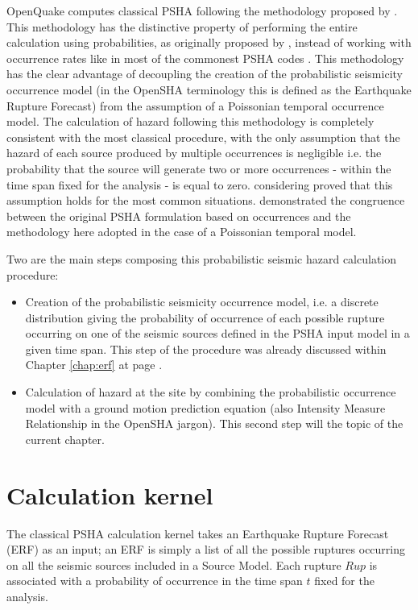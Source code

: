 OpenQuake computes classical PSHA 
\citep{cornell1968,mcguire2004} following the methodology proposed by 
\citet{field2003}. This methodology has the distinctive property of performing
the entire calculation using probabilities, as originally proposed by 
\citet{chiang1984}, instead of working with occurrence rates like in most 
of the commonest PSHA codes \citep[see for instance][]{bender1987}. 
%
This methodology has the clear advantage of decoupling the creation of the 
probabilistic seismicity occurrence model (in the OpenSHA terminology this is 
defined as the Earthquake Rupture Forecast) from the assumption of a Poissonian 
temporal occurrence model. 
%
The calculation of hazard following this methodology is completely consistent 
with the most classical procedure, with the only assumption that the hazard 
of each source produced by multiple occurrences is negligible i.e. the 
probability that the source will generate two or more occurrences - within the 
time span fixed for the analysis - is equal to zero. 
% 
\citet{pagani2007} considering proved that this assumption holds for the 
most common situations.
%
\citet{field2003} demonstrated the congruence between the original PSHA 
formulation based on occurrences and the methodology here adopted 
in the case of a Poissonian temporal model. 

Two are the main steps composing this probabilistic seismic hazard calculation 
procedure:
\begin{itemize}
\item Creation of the probabilistic seismicity occurrence model, i.e. a discrete 
distribution giving the probability of occurrence of each possible rupture 
occurring on one of the seismic sources defined in the PSHA input model in a  
given time span. This step of the procedure was already discussed within 
Chapter \ref{chap:erf} at page \pageref{chap:erf}.
\item Calculation of hazard at the site by combining the probabilistic 
occurrence model with a ground motion prediction equation (also Intensity 
Measure Relationship in the OpenSHA jargon). This second step will the topic 
of the current chapter.
\end{itemize}
%
\section{Calculation kernel}
The classical PSHA calculation kernel takes an Earthquake Rupture Forecast (ERF) 
as an input; an ERF is simply a list of all the possible ruptures occurring on 
all the seismic sources included in a Source Model. 
%
Each rupture $Rup$ is associated with a probability of occurrence in the time span
$t$ fixed for the analysis. 
 
